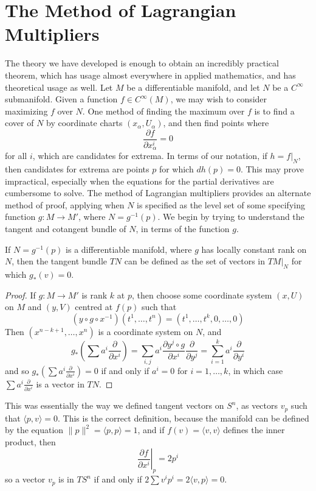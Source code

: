 \section{The Method of Lagrangian Multipliers}

The theory we have developed is enough to obtain an incredibly practical theorem, which has usage almost everywhere in applied mathematics, and has theoretical usage as well. Let $M$ be a differentiable manifold, and let $N$ be a $C^\infty$ submanifold. Given a function $f \in C^\infty(M)$, we may wish to consider maximizing $f$ over $N$. One method of finding the maximum over $f$ is to find a cover of $N$ by coordinate charts $(x_\alpha,U_\alpha)$, and then find points where
%
\[ \frac{\partial f}{\partial x^i_\alpha} = 0 \]
%
for all $i$, which are candidates for extrema. In terms of our notation, if $h = f|_N$, then candidates for extrema are points $p$ for which $dh(p) = 0$. This may prove impractical, especially when the equations for the partial derivatives are cumbersome to solve. The method of Lagrangian multipliers provides an alternate method of proof, applying when $N$ is specified as the level set of some specifying function $g: M \to M'$, where $N = g^{-1}(p)$. We begin by trying to understand the tangent and cotangent bundle of $N$, in terms of the function $g$.

\begin{theorem}
    If $N = g^{-1}(p)$ is a differentiable manifold, where $g$ has locally constant rank on $N$, then the tangent bundle $TN$ can be defined as the set of vectors in $TM|_N$ for which $g_*(v) = 0$.
\end{theorem}
\begin{proof}
    If $g: M \to M'$ is rank $k$ at $p$, then choose some coordinate system $(x,U)$ on $M$ and $(y,V)$ centred at $f(p)$ such that
    \[ (y \circ g \circ x^{-1})(t^1, \dots, t^n) = (t^1, \dots, t^k, 0, \dots, 0) \]
    Then $(x^{n-k+1}, \dots, x^n)$ is a coordinate system on $N$, and
    \[ g_* \left( \sum a^i \frac{\partial}{\partial x^i} \right) = \sum_{i,j} a^i \frac{\partial y^j \circ g}{\partial x^i} \frac{\partial}{\partial y^j} = \sum_{i = 1}^k a^i \frac{\partial}{\partial y^i} \]
    and so $g_* \left(\sum a^i \frac{\partial}{\partial x^i} \right) = 0$ if and only if $a^i = 0$ for $i = 1, \dots, k$, in which case $\sum a^i \frac{\partial}{\partial x^i}$ is a vector in $TN$.
\end{proof}

\begin{example}
This was essentially the way we defined tangent vectors on $S^n$, as vectors $v_p$ such that $\langle p, v \rangle = 0$. This is the correct definition, because the manifold can be defined by the equation $\| p \|^2 = \langle p, p \rangle = 1$, and if $f(v) = \langle v, v \rangle$ defines the inner product, then
%
\[ \left. \frac{\partial f}{\partial x^i} \right|_p = 2p^i \]
%
so a vector $v_p$ is in $TS^n$ if and only if $2 \sum v^i p^i = 2 \langle v, p \rangle = 0$.
\end{example}

